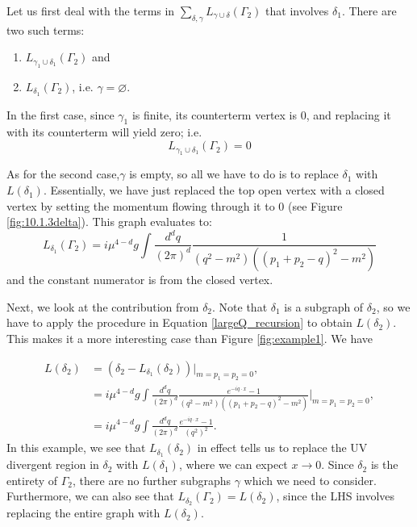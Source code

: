 \documentclass{article}
\begin{document}
Let us first deal with the terms in $\sum_{\delta,\gamma} L_{\gamma \cup \delta}(\Gamma_2)$ that involves $\delta_1$. There are two such terms:
\begin{enumerate}
    \item $L_{\gamma_1 \cup \delta_1}(\Gamma_2)$ and
    \item $L_{\delta_1}(\Gamma_2)$, i.e. $\gamma = \varnothing$.
\end{enumerate}
In the first case, since $\gamma_1$ is finite, its counterterm vertex is 0, and replacing it with its counterterm will yield zero; i.e.
\begin{equation}
    L_{\gamma_1 \cup \delta_1}(\Gamma_2) = 0
\end{equation}

As for the second case,$\gamma$ is empty, so all we have to do is to replace $\delta_1$ with $L(\delta_1)$.  Essentially, we have just replaced the top open vertex with a closed vertex by setting the momentum flowing through it to 0 (see Figure \ref{fig:10.1.3delta}). This graph evaluates to:
\begin{equation}
    L_{\delta_1}(\Gamma_2) = i\mu^{4-d}g\int \frac{d^dq}{(2\pi)^d}\frac{1}{(q^2-m^2)((p_1+p_2-q)^2-m^2)}
\end{equation}
and the constant numerator is from the closed vertex.

Next, we look at the contribution from $\delta_2$. Note that $\delta_1$ is a subgraph of $\delta_2$, so we have to apply the procedure in Equation \ref{largeQ_recursion} to obtain $L(\delta_2)$. This makes it a more interesting case than Figure \ref{fig:example1}. We have

\begin{equation}
    \begin{split}
        L(\delta_2) &= (\delta_2 - L_{\delta_1}(\delta_2))\vert_{m=p_1=p_2=0},\\
        &=i\mu^{4-d}g \int \frac{d^dq}{(2\pi)^d} \frac{e^{-iq\cdot x}-1}{(q^2-m^2)((p_1+p_2-q)^2-m^2)}\bigg\vert_{m=p_1=p_2=0},\\
        &=i\mu^{4-d}g \int \frac{d^dq}{(2\pi)^d} \frac{e^{-iq\cdot x}-1}{(q^2)^2}.
    \end{split}
\end{equation}
In this example, we see that $L_{\delta_1}(\delta_2)$ in effect tells us to replace the UV divergent region in $\delta_2$ with $L(\delta_1)$, where we can expect $x\rightarrow 0$. Since $\delta_2$ is the entirety of $\Gamma_2$, there are no further subgraphs $\gamma$ which we need to consider. Furthermore, we can also see that $L_{\delta_2}(\Gamma_2)=L(\delta_2)$, since the LHS involves replacing the entire graph with $L(\delta_2)$.
\end{document}
